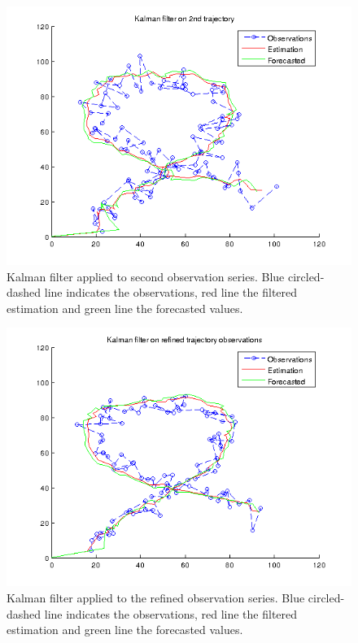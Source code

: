 \documentclass[a4paper, 12pt, titlepage]{article}
\begin{document}
\begin{figure}
	\includegraphics[width=15cm]{images/2trajectory.png}
	\caption{Kalman filter applied to second observation series. Blue circled-dashed line indicates the observations, red line the filtered estimation and green line the forecasted values.}
	\label{fig:2}
\end{figure}

\begin{figure}
	\includegraphics[width=15cm]{images/refinedTrajectory.png}
	\caption{Kalman filter applied to the refined observation series. Blue circled-dashed line indicates the observations, red line the filtered estimation and green line the forecasted values.}
	\label{fig:3}
\end{figure}
\end{document}

